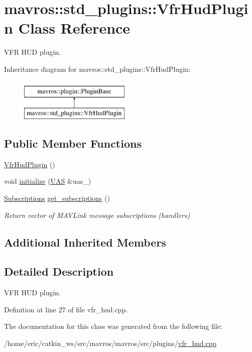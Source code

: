 \hypertarget{classmavros_1_1std__plugins_1_1VfrHudPlugin}{}\section{mavros\+::std\+\_\+plugins\+::Vfr\+Hud\+Plugin Class Reference}
\label{classmavros_1_1std__plugins_1_1VfrHudPlugin}


V\+FR H\+UD plugin.  


Inheritance diagram for mavros\+::std\+\_\+plugins\+::Vfr\+Hud\+Plugin\+:\begin{figure}[H]
\begin{center}
\leavevmode
\includegraphics[height=2.000000cm]{classmavros_1_1std__plugins_1_1VfrHudPlugin}
\end{center}
\end{figure}
\subsection*{Public Member Functions}
\begin{DoxyCompactItemize}
\item 
\mbox{\hyperlink{group__plugin_ga3657bfeb1a29cd38bf912fa874f7b72b}{Vfr\+Hud\+Plugin}} ()
\item 
void \mbox{\hyperlink{group__plugin_gacf050334e6d790e496ca5a35a5e34f2d}{initialize}} (\mbox{\hyperlink{classmavros_1_1UAS}{U\+AS}} \&uas\+\_\+)
\item 
\mbox{\hyperlink{group__plugin_ga8967d61fc77040e0c3ea5a4585d62a09}{Subscriptions}} \mbox{\hyperlink{group__plugin_ga432994278dd02aa09f57ab7dc93fa109}{get\+\_\+subscriptions}} ()
\begin{DoxyCompactList}\small\item\em Return vector of M\+A\+V\+Link message subscriptions (handlers) \end{DoxyCompactList}\end{DoxyCompactItemize}
\subsection*{Additional Inherited Members}


\subsection{Detailed Description}
V\+FR H\+UD plugin. 

Definition at line 27 of file vfr\+\_\+hud.\+cpp.



The documentation for this class was generated from the following file\+:\begin{DoxyCompactItemize}
\item 
/home/eric/catkin\+\_\+ws/src/mavros/mavros/src/plugins/\mbox{\hyperlink{vfr__hud_8cpp}{vfr\+\_\+hud.\+cpp}}\end{DoxyCompactItemize}
